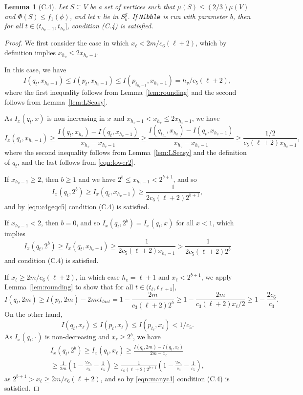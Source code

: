 \documentclass[11pt]{article}
\newtheorem{lemma}[theorem]{Lemma}
\def\vol#1{\mu \left(#1  \right)}
\begin{document}
\begin{lemma}[C.4]\label{lem:C4}
Let $S \subseteq V$ be a set of vertices
  such that
  $\vol{S} \leq (2/3) \vol{V}$ and
  $\Phi (S) \leq f_{1} (\phi )$, and
  let $v$ lie in $S^{g}_{b}$.
If \texttt{Nibble} is run with parameter $b$,
  then for all $t \in (t_{h_{v}-1}, t_{h_{v}}]$,
  condition (C.4) is satisfied.
\end{lemma}
\begin{proof}
We first consider the case in which $x_{\ell } < 2m / c_{6} (\ell +2)$,
  which by definition implies $x_{h_{v}} \leq  2 x_{h_{v}-1}$.

In this case,
  we have
\[
I (q_{t}, x_{h_{v}-1}) \leq I (p_{t}, x_{h_{v}-1})
\leq I (p_{t_{h_{v}-1}}, x_{h_{v}-1})
  = h_{v} / c_{5} (\ell +2),
\]
where the first inequality follows from Lemma~\ref{lem:rounding}
and the second follows from Lemma~\ref{lem:LSeasy}.

As $I_{x} (q_{t},x)$ is non-increasing in $x$
  and $x_{h_{v}-1} < x_{h_{v}} \leq 2 x_{h_{v}-1}$, we have
\[
 I_{x} (q_{t}, x_{h_{v}-1})
\geq
\frac{I (q_{t}, x_{h_{v}}) - I (q_{t}, x_{h_{v}-1})
}{x_{h_{v}} - x_{h_{v}-1}}
\geq
\frac{I (q_{t_{h_{v}}}, x_{h_{v}}) - I (q_{t}, x_{h_{v}-1})
}{x_{h_{v}} - x_{h_{v}-1}}
\geq
\frac{1 / 2 }{c_{5} (\ell +2) x_{h_{v}-1}},
\]
where the second inequality follows from Lemma~\ref{lem:LSeasy} and the definition
  of $q_{t}$, and the last follows from \eqref{eqn:lower2}.

If $x_{h_{v}-1} \geq 2$, then $b \geq 1$ 
  and we have $2^{b} \leq x_{h_{v}-1} < 2^{b+1}$,
 and so
\[
 I_{x} (q_{t}, 2^{b})
 \geq
 I_{x} (q_{t}, x_{h_{v}-1})
  \geq
 \frac{1 }{ 2 c_{5} (\ell +2) 2^{b+1}},
\]
and by \eqref{eqn:c4geqc5} condition (C.4) is satisfied.

If $x_{h_{v}-1} < 2$, then $b = 0$, and so 
  $I_{x} (q_{t}, 2^{b}) = I_{x} (q_{t},x)$ for all $x < 1$,
  which implies
\[
  I_{x} (q_{t}, 2^{b}) \geq 
  I_{x} (q_{t}, x_{h_{v}-1}) \geq
  \frac{1  }{2 c_{5} (\ell +2) x_{h_{v}-1}} >
 \frac{1 }{2 c_{5} (\ell +2) 2^{b}}
\]
and condition (C.4) is satisfied.

If $x_{\ell} \geq 2m  / c_{6} (\ell +2)$, in which case
  $h_{v} = \ell + 1$
  and $x_{\ell} < 2^{b+1}$,
  we apply Lemma~\ref{lem:rounding}  to show that
  for all $t \in (t_{\ell },   t_{\ell +1}]$,
\[
I (q_{t}, 2m)
\geq
I (p_{t}, 2m) - 2m \epsilon t_{last}
=
1 - \frac{2m}{c_{3} (\ell+2) 2^{b}}
\geq
1 - \frac{2m}{c_{3} (\ell+2) x_{\ell}/2}
\geq
1 - \frac{2 c_{6}}{c_{3}}.
\]
On the other hand,
\[
  I (q_{t}, x_{\ell })
\leq
  I (p_{t}, x_{\ell })
\leq
  I (p_{t_{\ell}}, x_{\ell })
<  1/c_{5}.
\]
As $I_{x} (q_{t}, \cdot)$ is non-decreasing and $x_{\ell} \geq 2^{b}$,
  we have
\begin{multline*}
I_{x} (q_{t}, 2^{b})
\geq 
I_{x} (q_{t}, x_{\ell})
\geq
\frac{
I (q_{t}, 2m)  -  I (q_{t}, x_{\ell })
}{
2m - x_{\ell }
}\\
\geq
\frac{1}{2m}
\left(
 1 - \frac{2 c_{6}}{c_{3}} - \frac{1}{c_{5}}
 \right)
\geq
\frac{1}{c_{6} (\ell + 2) 2^{b+1}}
\left(
 1 - \frac{2 c_{6}}{c_{3}} - \frac{1}{c_{5}}
 \right),
\end{multline*}
as $2^{b+1} > x_{\ell} \geq 2m / c_{6} (\ell+2)$,
and so by \eqref{eqn:manyc1} condition (C.4) is satisfied.
\end{proof}
\end{document}

